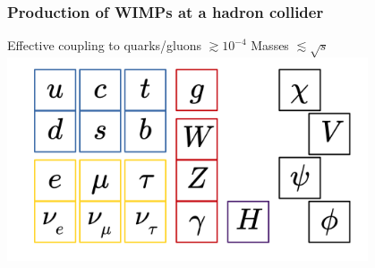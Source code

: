 \documentclass[aspectratio=169,xcolor=dvipsnames,,table,compress]{beamer}
\begin{document}
\begin{frame} \frametitle{Production of WIMPs at a hadron collider}
  \vspace{-5mm}
  \centering 
     Effective coupling to quarks/gluons $\gtrsim 10^{-4}$ \hspace{20mm}
    Masses $\lesssim \sqrt{s}$ \\ 
    \includegraphics[width=0.8\textwidth]{../figures/talk/dm_fields.pdf}
\end{frame}
\end{document}
